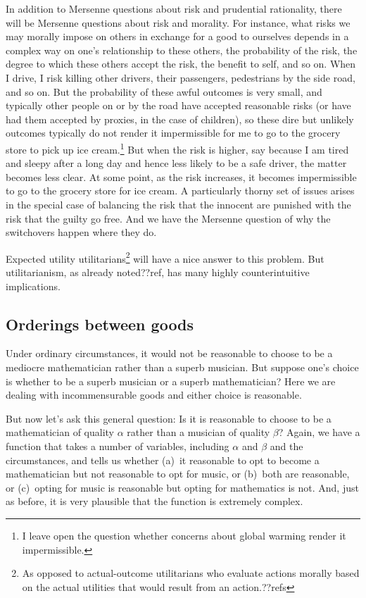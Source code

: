 In addition to Mersenne questions about risk and prudential rationality, there will be Mersenne questions about risk and morality.
For instance, what risks we may morally impose on others in exchange for a good to ourselves depends in a complex way 
on one's relationship to these others, the probability of the risk, the degree to which these others accept the risk, the 
benefit to self, and so on. When I drive, I risk killing other drivers, their passengers, pedestrians by the side road, and so on.
But the probability of these awful outcomes is very small, and typically other people on or by the road have accepted reasonable
risks (or have had them accepted by proxies, in the case of children), so these dire but unlikely outcomes typically do not render it impermissible for
me to go to the grocery store to pick up ice cream.\footnote{I leave open the question whether concerns about global warming 
render it impermissible.} But when the risk is higher, say because I am tired and sleepy after a long day and hence less likely to be
a safe driver, the matter becomes less clear. At some point, as the risk increases, it becomes impermissible to go to the grocery
store for ice cream. 
A particularly thorny set of issues arises in the special case of balancing the risk that the innocent are punished with the risk that the guilty go free.
And we have the Mersenne question of why the switchovers happen where they do.

Expected utility utilitarians\footnote{As opposed to actual-outcome utilitarians who evaluate actions morally based on the
actual utilities that would result from an action.??refs} will have a nice answer to this problem. But utilitarianism, as already
noted??ref, has many highly counterintuitive implications. 

\subsection{Orderings between goods}
Under ordinary circumstances, it would not be reasonable to choose to be a mediocre mathematician rather than a superb musician. 
But suppose one's choice is whether to be a superb
musician or a superb mathematician? Here we are dealing with incommensurable goods and either choice is reasonable.

But now let's ask this general question: Is it is reasonable to choose to be a mathematician of quality $\alpha$ rather than
a musician of quality $\beta$? Again, we have a function that takes a number of variables, including $\alpha$ and $\beta$
and the circumstances, and tells us whether (a)~it reasonable to opt to become a mathematician but not reasonable to opt for
music, or (b)~both are reasonable, or (c)~opting for music is reasonable but opting for mathematics is not. And, just as before,
it is very plausible that the function is extremely complex.

